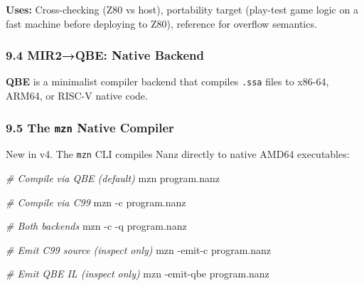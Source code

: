 \documentclass[
  11pt,
]{article}
\newenvironment{Shaded}{}{}
\newcommand{\AttributeTok}[1]{\textcolor[rgb]{0.49,0.56,0.16}{#1}}
\newcommand{\CommentTok}[1]{\textcolor[rgb]{0.38,0.63,0.69}{\textit{#1}}}
\newcommand{\ExtensionTok}[1]{#1}
\newcommand{\NormalTok}[1]{#1}
\begin{document}
\textbf{Uses:} Cross-checking (Z80 vs host), portability target
(play-test game logic on a fast machine before deploying to Z80),
reference for overflow semantics.

\subsubsection{9.4 MIR2→QBE: Native
Backend}\label{mir2qbe-native-backend}

\textbf{QBE} is a minimalist compiler backend that compiles
\texttt{.ssa} files to x86-64, ARM64, or RISC-V native code.

\begin{Shaded}
\end{Shaded}

\subsubsection{\texorpdfstring{9.5 The \texttt{mzn} Native
Compiler}{9.5 The mzn Native Compiler}}\label{the-mzn-native-compiler}

New in v4. The \texttt{mzn} CLI compiles Nanz directly to native AMD64
executables:

\begin{Shaded}
\begin{Highlighting}[]
\CommentTok{\# Compile via QBE (default)}
\ExtensionTok{mzn}\NormalTok{ program.nanz}

\CommentTok{\# Compile via C99}
\ExtensionTok{mzn} \AttributeTok{{-}c}\NormalTok{ program.nanz}

\CommentTok{\# Both backends}
\ExtensionTok{mzn} \AttributeTok{{-}c} \AttributeTok{{-}q}\NormalTok{ program.nanz}

\CommentTok{\# Emit C99 source (inspect only)}
\ExtensionTok{mzn} \AttributeTok{{-}emit{-}c}\NormalTok{ program.nanz}

\CommentTok{\# Emit QBE IL (inspect only)}
\ExtensionTok{mzn} \AttributeTok{{-}emit{-}qbe}\NormalTok{ program.nanz}
\end{Highlighting}
\end{Shaded}
\end{document}
